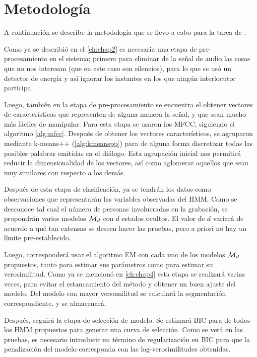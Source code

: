 
\chapter{Metodología}\label{ch:chap5}


A continuación se describe la metodología que se llevo a cabo para la tarea de \sd. 

Como ya se describió en el \autoref{ch:chap2} es necesaria una etapa de pre-procesamiento en el sistema; primero para eliminar de la señal de audio las cosas que no nos interesan (que en este caso son silencios), para lo que se usó un detector de energía y así ignorar los instantes en los que ningún interlocutor participa. 

Luego, también en la etapa de pre-procesamiento se encuentra el obtener vectores de características que representen de alguna manera la señal, y que sean mucho más fáciles de manipular. Para esta etapa se usaron los \ac{MFCC}, siguiendo el algoritmo \autoref{alg:mfcc}.  Después de obtener los vectores característicos, se agruparon mediante k-means++ (\autoref{alg:kmeanspp}) para de alguna forma discretizar todas las posibles palabras emitidas en el diálogo. Esta agrupación inicial nos permitirá reducir la dimensionalidad de los vectores, así como aglomerar aquellos que sean muy similares con respecto a los demás.

Después de esta etapa de clasificación, ya se tendrán los datos como observaciones que representarán las variables observadas del \ac{HMM}. Como se desconoce tal cual el número de personas involucradas en la grabación, se propondrán varios modelos $\mathcal{M}_d$ con $d$ estados ocultos. El valor de $d$ variará de acuerdo a qué tan extensas se deseen hacer las pruebas, pero a priori no hay un límite pre-establecido. 

Luego, corresponderá usar el algoritmo \ac{EM} con cada uno de los modelos $\mathcal{M}_d$ propuestos, tanto para estimar sus parámetros como para estimar su verosimilitud. Como ya se mencionó en \autoref{ch:chap4} esta etapa se realizará varias veces, para evitar el estancamiento del método y obtener un buen ajuste del modelo. Del modelo con mayor versomilitud se calculará la segmentación correspondiente, y se almacenará. 

Después, seguirá la etapa de selección de modelo. Se estimará \ac{BIC} para de todos los \ac{HMM} propuestos para generar una curva de selección. Como se verá en las pruebas, es necesario introducir un término de regularización en \ac{BIC} para que la penalización del modelo corresponda con las log-verosimilitudes obtenidas. 

